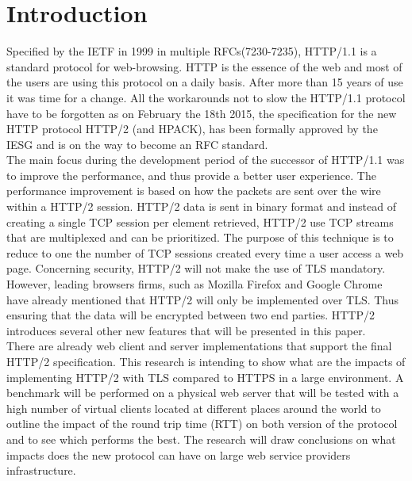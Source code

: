 \section{Introduction}
\label{chap:intro}
Specified by the IETF in 1999 in multiple RFCs(7230-7235\cite{RFC723x}), HTTP/1.1 is a standard protocol for web-browsing. HTTP is the essence of the web and most of the users are using this protocol on a daily basis. After more than 15 years of use it was time for a change. All the workarounds not to slow the HTTP/1.1 protocol have to be forgotten as on February the 18th 2015, the specification \cite{http2} for the new HTTP protocol HTTP/2 (and HPACK\cite{hpack}), has been formally approved by the IESG and is on the way to become an RFC standard.   \\
The main focus during the development period of the successor of HTTP/1.1 was to improve the performance, and thus provide a better user experience. The performance improvement is based on how the packets are sent over the wire within a HTTP/2 session. HTTP/2 data is sent in binary format and instead of creating a single TCP session per element retrieved, HTTP/2 use TCP streams that are multiplexed and can be prioritized. The purpose of this technique is to reduce to one the number of TCP sessions created every time a user access a web page. Concerning security, HTTP/2 will not make the use of TLS mandatory. However, leading browsers firms, such as Mozilla Firefox and Google Chrome have already mentioned that HTTP/2 will only be implemented over TLS. Thus ensuring that the data will be encrypted between two end parties. HTTP/2 introduces several other new features that will be presented in this paper. \\
There are already web client and server implementations\cite{http2-imp} that support the final HTTP/2 specification. This research is intending to show what are the impacts of implementing HTTP/2 with TLS compared to HTTPS in a large environment. A benchmark will be performed on a physical web server that will be tested with a high number of virtual clients located at different places around the world to outline the impact of the round trip time (RTT) on both version of the protocol and to see which performs the best. The research will draw conclusions on what impacts does the new protocol can have on large web service providers infrastructure.